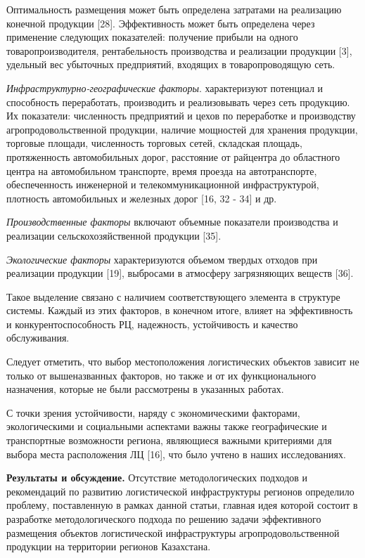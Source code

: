 Оптимальность размещения может быть определена затратами на реализацию
конечной продукции {[}28{]}. Эффективность может быть определена через
применение следующих показателей: получение прибыли на одного
товаропроизводителя, рентабельность производства и реализации продукции
{[}3{]}, удельный вес убыточных предприятий, входящих в товаропроводящую
сеть.

\emph{Инфраструктурно-географические факторы}. характеризуют потенциал и
способность переработать, производить и реализовывать через сеть
продукцию. Их показатели: численность предприятий и цехов по переработке
и производству агропродовольственной продукции, наличие мощностей для
хранения продукции, торговые площади, численность торговых сетей,
складская площадь, протяженность автомобильных дорог, расстояние от
райцентра до областного центра на автомобильном транспорте, время
проезда на автотранспорте, обеспеченность инженерной и
телекоммуникационной инфраструктурой, плотность автомобильных и железных
дорог {[}16, 32 - 34{]} и др.

\emph{Производственные факторы} включают объемные показатели
производства и реализации сельскохозяйственной продукции {[}35{]}.

\emph{Экологические факторы} характеризуются объемом твердых отходов при
реализации продукции {[}19{]}, выбросами в атмосферу загрязняющих
веществ {[}36{]}.

Такое выделение связано с наличием соответствующего элемента в структуре
системы. Каждый из этих факторов, в конечном итоге, влияет на
эффективность и конкурентоспособность РЦ, надежность, устойчивость и
качество обслуживания.

Следует отметить, что выбор местоположения логистических объектов
зависит не только от вышеназванных факторов, но также и от их
функционального назначения, которые не были рассмотрены в указанных
работах.

С точки зрения устойчивости, наряду с экономическими факторами,
экологическими и социальными аспектами важны также географические и
транспортные возможности региона, являющиеся важными критериями для
выбора места расположения ЛЦ {[}16{]}, что было учтено в наших
исследованиях.

{\bfseries Результаты и обсуждение.} Отсутствие методологических подходов и
рекомендаций по развитию логистической инфраструктуры регионов
определило проблему, поставленную в рамках данной статьи, главная идея
которой состоит в разработке методологического подхода по решению задачи
эффективного размещения объектов логистической инфраструктуры
агропродовольственной продукции на территории регионов Казахстана.

